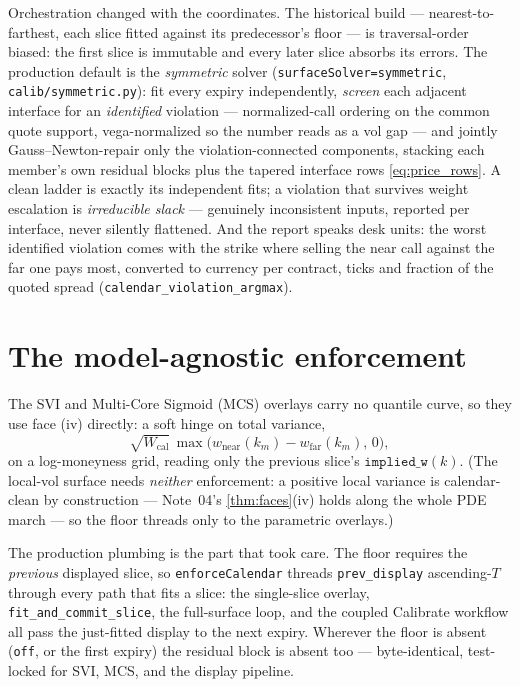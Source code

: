 \documentclass[11pt]{article}
\begin{document}
Orchestration changed with the coordinates. The historical build ---
nearest-to-farthest, each slice fitted against its predecessor's floor ---
is traversal-order biased: the first slice is immutable and every later
slice absorbs its errors. The production default is the \emph{symmetric}
solver (\texttt{surfaceSolver=symmetric}, \nolinkurl{calib/symmetric.py}):
fit every expiry independently, \emph{screen} each adjacent interface for
an \emph{identified} violation --- normalized-call ordering on the common
quote support, vega-normalized so the number reads as a vol gap --- and
jointly Gauss--Newton-repair only the violation-connected components,
stacking each member's own residual blocks plus the tapered interface rows
\eqref{eq:price_rows}. A clean ladder is exactly its independent fits; a
violation that survives weight escalation is \emph{irreducible slack} ---
genuinely inconsistent inputs, reported per interface, never silently
flattened. And the report speaks desk units: the worst identified violation
comes with the strike where selling the near call against the far one pays
most, converted to currency per contract, ticks and fraction of the quoted
spread (\nolinkurl{calendar_violation_argmax}).

\section{The model-agnostic enforcement}
\label{sec:agnostic}

The SVI and Multi-Core Sigmoid (MCS) overlays carry no quantile curve, so
they use face (iv) directly: a soft hinge on total variance,
\begin{equation}
\sqrt{W_{\text{cal}}}\,\max\!\big(w_{\text{near}}(k_m)-w_{\text{far}}(k_m),\,0\big),
\label{eq:wfloor}
\end{equation}
on a log-moneyness grid, reading only the previous slice's
$\texttt{implied\_w}(k)$. (The local-vol surface needs \emph{neither}
enforcement: a positive local variance is calendar-clean by construction ---
Note~04's \cref{thm:faces}(iv) holds along the whole PDE march --- so the
floor threads only to the parametric overlays.)

The production plumbing is the part that took care. The floor requires the
\emph{previous} displayed slice, so \texttt{enforceCalendar} threads
\texttt{prev\_display} ascending-$T$ through every path that fits a slice:
the single-slice overlay, \texttt{fit\_and\_commit\_slice}, the full-surface
loop, and the coupled Calibrate workflow all pass the just-fitted display to
the next expiry. Wherever the floor is absent (\texttt{off}, or the first
expiry) the residual block is absent too --- byte-identical, test-locked for
SVI, MCS, and the display pipeline.
\end{document}
